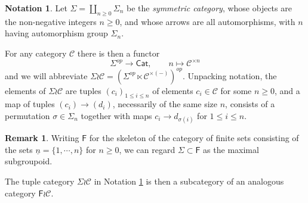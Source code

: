 \documentclass[a4paper,10pt
,draft
]{article}%
\numberwithin{equation}{section}
\numberwithin{figure}{section}
\theoremstyle{definition} %
\newtheorem{remark}[equation]{Remark}%
\newtheorem{notation}[equation]{Notation}%
\newcommand{\longto}{\longrightarrow}%
\newcommand{\Cat}{\mathsf{Cat}}
\newcommand{\C}{\ensuremath{\mathcal C}}
\newcommand{\1}{\ensuremath{\mathbbm 1}}%
\begin{document}
\begin{notation}\label{SIGWR NOT}
	Let $\Sigma = \coprod_{n \geq 0} \Sigma_n$
	be the \emph{symmetric category},
	whose objects are the non-negative integers $n\geq 0$,
	and whose arrows are all automorphisms,
	with $n$ having automorphism group $\Sigma_n$.
	
	For any category $\mathcal{C}$ there is then a functor
	\begin{equation}
	\Sigma^{op} \longto \Cat,
	\qquad
	n \mapsto \mathcal C^{\times n}
	\end{equation}
	and we will abbreviate
	$\Sigma \wr \C = 
	\left(\Sigma^{op} \ltimes \mathcal C^{\times (-)}\right)^{op}$.
	Unpacking notation, 
	the elements of $\Sigma \wr \mathcal{C}$
	are tuples
	$(c_i)_{1 \leq i \leq n}$
	of elements $c_i \in \mathcal{C}$ for some $n \geq 0$,
	and a map of tuples $(c_i) \to (d_i)$, 
	necessarily of the same size $n$,
	consists of a permutation 
	$\sigma \in \Sigma_n$
	together with maps
	$c_i \to d_{\sigma(i)}$
	for $1 \leq i \leq n$.
\end{notation}




\begin{remark}\label{FWR REM}
	Writing $\mathsf{F}$ for the skeleton of 
	the category of finite sets consisting of the sets 
	$\underline{n} = \{1,\cdots,n\}$ for $n \geq 0$,
	we can regard
	$\Sigma \subset \mathsf{F}$
	as the maximal subgroupoid.
	
	The tuple category $\Sigma \wr \mathcal{C}$
	in Notation \ref{SIGWR NOT}
	is then a subcategory of an analogous category
	$\mathsf{F} \wr \mathcal{C}$.
\end{remark}
\end{document}
